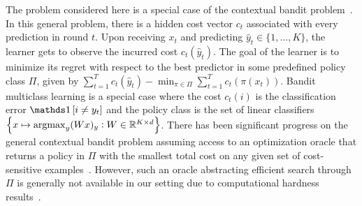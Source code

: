 
The problem considered here is a special case of the
contextual bandit problem~\citep{Auer-2003, Langford-Zhang-2008}.
In this general problem, there is a hidden cost vector $c_t$ associated with every prediction in round $t$.  Upon receiving $x_t$ and predicting $\widehat{y}_t \in \{1,\ldots,K\}$, the learner gets to observe the incurred cost $c_t(\widehat{y}_t)$.
The goal of the learner is to minimize its regret with respect to the best predictor in some predefined policy class $\Pi$, given by $\sum_{t=1}^T c_t(\widehat{y}_t) -
\min_{\pi \in \Pi} \sum_{t=1}^T c_t(\pi(x_t))$.
Bandit multiclass learning is a special case
where the cost $c_t(i)$ is the classification error $\indicator{i \neq y_t}$ and
the policy class is the set of linear classifiers $\cbr{x \mapsto \argmax_y (Wx)_y: W \in \R^{K \times d}}$.
There has been significant progress on the general contextual bandit problem
assuming access to an optimization oracle that returns a policy in $\Pi$ with the smallest total cost on any given set of cost-sensitive examples~\citep{Dudik-Hsu-Kale-Karampatziakis-Langford-Reyzin-Zhang-2011,
Agarwal-Hsu-Kale-Langford-Li-Schapire-2014, Rakhlin-Sridharan-2016,
Syrgkanis-Krishnamurthy-Schapire-2016,
Syrgkanis-Luo-Krishnamurthy-Schapire-2016}.
However, such an oracle abstracting efficient search through $\Pi$ is generally not available
in our setting due to computational hardness results~\citep{Arora-Babai-Stern-Sweedyk-1997}.




